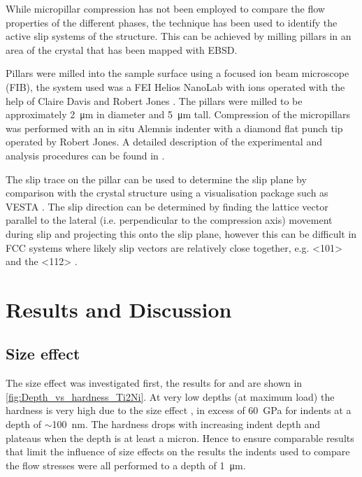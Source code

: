 
While micropillar compression has not been employed to compare the flow properties of the different phases, the technique has been used to identify the active slip systems of the  structure. This can be achieved by milling pillars in an area of the crystal that has been mapped with EBSD. 

Pillars were milled into the sample surface using a focused ion beam microscope (FIB), the system used was a FEI Helios NanoLab with  ions operated with the help of Claire Davis \cite{Davis2015} and Robert Jones \cite{Jones2016}. The pillars were milled to be approximately \SI{2}{\micro\meter} in diameter and \SI{5}{\micro\meter} tall. Compression of the micropillars was performed with an in situ Alemnis indenter with a diamond flat punch tip operated by Robert Jones. A detailed description of the experimental and analysis procedures can be found in \cite{Davis2015}.

The slip trace on the pillar can be used to determine the slip plane by comparison with the crystal structure using a visualisation package such as VESTA \cite{Momma2011,Davis2015}. The slip direction can be determined by finding the lattice vector parallel to the lateral (i.e. perpendicular to the compression axis) movement during slip and projecting this onto the slip plane, however this can be difficult in FCC systems where likely slip vectors are relatively close together, e.g. <101> and the <112> \cite{Davis2015}.


\section{Results and Discussion}


\subsection{Size effect}


The size effect was investigated first, the results for  and  are shown in \autoref{fig:Depth_vs_hardness_Ti2Ni}. At very low depths (at maximum load) the hardness is very high due to the size effect \cite{Cripps2011}, in excess of \SI{60}{\giga\pascal} for indents at a depth of $\sim$\SI{100}{\nano\meter}. The hardness drops with increasing indent depth and plateaus when the depth is at least a micron. Hence to ensure comparable results that limit the influence of size effects on the results the indents used to compare the flow stresses were all performed to a depth of \SI{1}{\micro\meter}. 

